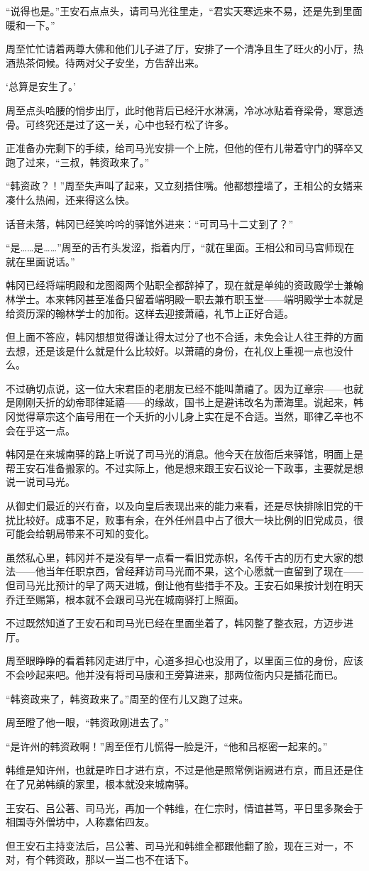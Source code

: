“说得也是。”王安石点点头，请司马光往里走，“君实天寒远来不易，还是先到里面暖和一下。”

周至忙忙请着两尊大佛和他们儿子进了厅，安排了一个清净且生了旺火的小厅，热酒热茶伺候。待两对父子安坐，方告辞出来。

‘总算是安生了。’

周至点头哈腰的悄步出厅，此时他背后已经汗水淋漓，冷冰冰贴着脊梁骨，寒意透骨。可终究还是过了这一关，心中也轻冇松了许多。

正准备办完剩下的手续，给司马光安排一个上院，但他的侄冇儿带着守门的驿卒又跑了过来，“三叔，韩资政来了。”

“韩资政？！”周至失声叫了起来，又立刻捂住嘴。他都想撞墙了，王相公的女婿来凑什么热闹，还来得这么快。

话音未落，韩冈已经笑吟吟的驿馆外进来：“可司马十二丈到了？”

“是……是……”周至的舌冇头发涩，指着内厅，“就在里面。王相公和司马宫师现在就在里面说话。”

韩冈已经将端明殿和龙图阁两个贴职全都辞掉了，现在就是单纯的资政殿学士兼翰林学士。本来韩冈甚至准备只留着端明殿一职去兼冇职玉堂——端明殿学士本就是给资历深的翰林学士的加衔。这样去迎接萧禧，礼节上正好合适。

但上面不答应，韩冈想想觉得谦让得太过分了也不合适，未免会让人往王莽的方面去想，还是该是什么就是什么比较好。以萧禧的身份，在礼仪上重视一点也没什么。

不过确切点说，这一位大宋君臣的老朋友已经不能叫萧禧了。因为辽章宗——也就是刚刚夭折的幼帝耶律延禧——的缘故，国书上是避讳改名为萧海里。说起来，韩冈觉得章宗这个庙号用在一个夭折的小儿身上实在是不合适。当然，耶律乙辛也不会在乎这一点。

韩冈是在来城南驿的路上听说了司马光的消息。他今天在放衙后来驿馆，明面上是帮王安石准备搬家的。不过实际上，他是想来跟王安石议论一下政事，主要就是想说一说司马光。

从御史们最近的兴冇奋，以及向皇后表现出来的能力来看，还是尽快排除旧党的干扰比较好。成事不足，败事有余，在外任州县中占了很大一块比例的旧党成员，很可能会给朝局带来不可知的变化。

虽然私心里，韩冈并不是没有早一点看一看旧党赤帜，名传千古的历冇史大家的想法——他当年任职京西，曾经拜访司马光而不果，这个心愿就一直留到了现在——但司马光比预计的早了两天进城，倒让他有些措手不及。王安石如果按计划在明天乔迁至赐第，根本就不会跟司马光在城南驿打上照面。

不过既然知道了王安石和司马光已经在里面坐着了，韩冈整了整衣冠，方迈步进厅。

周至眼睁睁的看着韩冈走进厅中，心道多担心也没用了，以里面三位的身份，应该不会吵起来吧。他并没有将司马康和王旁算进来，那两位衙内只是插花而已。

“韩资政来了，韩资政来了。”周至的侄冇儿又跑了过来。

周至瞪了他一眼，“韩资政刚进去了。”

“是许州的韩资政啊！”周至侄冇儿慌得一脸是汗，“他和吕枢密一起来的。”

韩维是知许州，也就是昨日才进冇京，不过是他是照常例诣阙进冇京，而且还是住在了兄弟韩缜的家里，根本就没来城南驿。

王安石、吕公著、司马光，再加一个韩维，在仁宗时，情谊甚笃，平日里多聚会于相国寺外僧坊中，人称嘉佑四友。

但王安石主持变法后，吕公著、司马光和韩维全都跟他翻了脸，现在三对一，不对，有个韩资政，那以一当二也不在话下。

